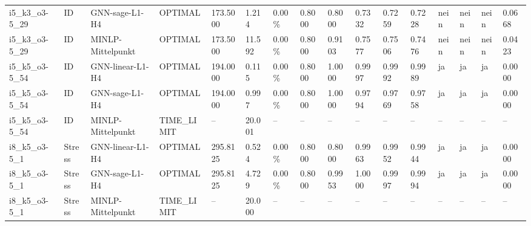 \documentclass[a4paper,landscape]{article}
\begin{document}
\begin{longtable}{llllllllllllllll}
i5\_k3\_o3-5\_29 & ID & GNN-sage-L1-H4 & OPTIMAL & 173.5000 & 1.214 & 0.00\% & 0.8000 & 0.8000 & 0.7332 & 0.7259 & 0.7228 & nein & nein & nein & 0.0668 \\
i5\_k3\_o3-5\_29 & ID & MINLP-Mittelpunkt & OPTIMAL & 173.5000 & 11.592 & 0.00\% & 0.8000 & 0.9103 & 0.7577 & 0.7506 & 0.7476 & nein & nein & nein & 0.0423 \\
i5\_k5\_o3-5\_54 & ID & GNN-linear-L1-H4 & OPTIMAL & 194.0000 & 0.115 & 0.00\% & 0.8000 & 1.0000 & 0.9997 & 0.9992 & 0.9989 & ja & ja & ja & 0.0000 \\
i5\_k5\_o3-5\_54 & ID & GNN-sage-L1-H4 & OPTIMAL & 194.0000 & 0.997 & 0.00\% & 0.8000 & 1.0000 & 0.9794 & 0.9769 & 0.9758 & ja & ja & ja & 0.0000 \\
i5\_k5\_o3-5\_54 & ID & MINLP-Mittelpunkt & TIME\_LIMIT & -- & 20.001 & -- & -- & -- & -- & -- & -- & -- & -- & -- & -- \\
i8\_k5\_o3-5\_1 & Stress & GNN-linear-L1-H4 & OPTIMAL & 295.8125 & 0.524 & 0.00\% & 0.8000 & 0.8000 & 0.9963 & 0.9952 & 0.9944 & ja & ja & ja & 0.0000 \\
i8\_k5\_o3-5\_1 & Stress & GNN-sage-L1-H4 & OPTIMAL & 295.8125 & 4.729 & 0.00\% & 0.8000 & 0.9953 & 1.0000 & 0.9997 & 0.9994 & ja & ja & ja & 0.0000 \\
i8\_k5\_o3-5\_1 & Stress & MINLP-Mittelpunkt & TIME\_LIMIT & -- & 20.000 & -- & -- & -- & -- & -- & -- & -- & -- & -- & -- \\
\bottomrule
\end{longtable}
\end{document}
